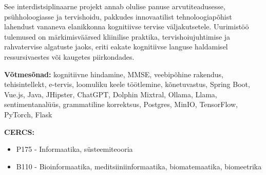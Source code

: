 {{See interdistsiplinaarne projekt annab olulise panuse arvutiteadusesse, psühholoogiasse ja tervishoidu, pakkudes innovaatilist tehnoloogiapõhist lahendust vananeva elanikkonna kognitiivse tervise väljakutsetele. Uurimistöö tulemused on märkimisväärsed kliinilise praktika, tervishoiujuhtimise ja rahvatervise algatuste jaoks, eriti eakate kognitiivse languse haldamisel ressursivaestes või kaugetes piirkondades.


\vspace*{1ex}
\noindent\textbf{Võtmesõnad:} kognitiivne hindamine, MMSE, veebipõhine rakendus, tehisintellekt, e-tervis, loomuliku keele töötlemine, kõnetuvastus, Spring Boot, Vue.js, Java, JHipster, ChatGPT, Dolphin Mixtral, Ollama, Llama, sentimentanalüüs, grammatiline korrektsus, Postgres, MinIO, TensorFlow, PyTorch, Flask

\vspace*{1ex}
\newpage
\noindent\textbf{CERCS:} 
\begin{itemize}
    \item P175 - Informaatika, süsteemiteooria
    \item B110 - Bioinformaatika, meditsiiniinformaatika, biomatemaatika, biomeetrika
\end{itemize}
\vspace*{1ex}
}}%


